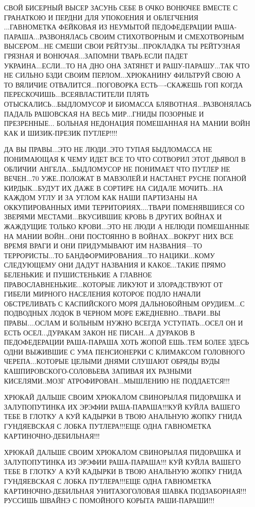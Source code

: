 СВОЙ БИСЕРНЫЙ ВЫСЕР ЗАСУНЬ СЕБЕ В ОЧКО ВОНЮЧЕЕ ВМЕСТЕ С ГРАНАТКОЮ И ПЕРДНИ ДЛЯ
УПОКОЕНИЯ И ОБЛЕГЧЕНИЯ ...ГАВНОМЕТКА ФЕЙКОВАЯ ИЗ НЕУМЫТОЙ ПЕДОФЕДЕРАЦИИ
РАША-ПАРАША...РАЗВОНЯЛАСЬ СВОИМ СТИХОТВОРНЫМ И СМЕХОТВОРНЫМ ВЫСЕРОМ...НЕ СМЕШИ
СВОИ РЕЙТУЗЫ...ПРОКЛАДКА ТЫ РЕЙТУЗНАЯ ГРЯЗНАЯ И ВОНЮЧАЯ...ЗАПОМНИ ТВАРЬ.ЕСЛИ
ПАДЕТ УКРАИНА...ЕСЛИ...ТО НА ДНО ОНА ЗАТЯНЕТ И РАШУ-ПАРАШУ...ТАК ЧТО НЕ СИЛЬНО
БЗДИ СВОИМ ПЕРЛОМ...ХРЮКАНИНУ ФИЛЬТРУЙ СВОЮ А ТО ВЯЛИЧИЕ ОТВАЛИТСЯ...ПОГОВОРКА
ЕСТЬ----СКАЖЕШЬ ГОП КОГДА ПЕРЕСКОЧИШЬ...ВСЕЯВЛАСТИТЕЛИ ПЛЯТЬ
ОТЫСКАЛИСЬ...БЫДЛОМУСОР И БИОМАССА БЛЯВОТНАЯ...РАЗВОНЯЛАСЬ ПАДАЛЬ РАШОВСКАЯ НА
ВЕСЬ МИР...ГНИДЫ ПОЗОРНЫЕ И ПРЕЗРЕННЫЕ... БОЛЬНАЯ НЕДОНАЦИЯ ПОМЕШАННАЯ НА МАНИИ
ВОЙН КАК И ШИЗИК-ПРЕЗИК ПУТЛЕР!!!!                              


ДА ВЫ ПРАВЫ...ЭТО НЕ ЛЮДИ..ЭТО ТУПАЯ БЫДЛОМАССА НЕ ПОНИМАЮЩАЯ К ЧЕМУ ИДЕТ ВСЕ
ТО ЧТО СОТВОРИЛ ЭТОТ ДЬЯВОЛ В ОБЛИЧИИ АНГЕЛА...БЫДЛОМУСОР НЕ ПОНИМАЕТ ЧТО
ПУТЛЕР НЕ ВЕЧЕН...70 УЖЕ..ПОЛОЖАТ В МАВЗОЛЕЙ.И НАСТАНЕТ РУСНЕ ПОГАНОЙ
КИРДЫК...БУДУТ ИХ ДАЖЕ В СОРТИРЕ НА СИДАЛЕ МОЧИТЬ...НА КАЖДОМ УГЛУ И ЗА УГЛОМ
КАК НАШИ ПАРТИЗАНЫ НА ОККУПИРОВАННЫХ ИМИ ТЕРРИТОРИЯХ....ТВАРИ ПОМЕНЯВШИЕСЯ СО
ЗВЕРЯМИ МЕСТАМИ...ВКУСИВШИЕ КРОВЬ В ДРУГИХ ВОЙНАХ И ЖАЖДУЩИЕ ТОЛЬКО КРОВИ...ЭТО
НЕ ЛЮДИ А НЕЛЮДИ ПОМЕШАННЫЕ НА МАНИИ ВОЙН...ОНИ ПОСТОЯННО В ВОЙНАХ...ВОКРУГ НИХ
ВСЕ ВРЕМЯ ВРАГИ И ОНИ ПРИДУМЫВАЮТ ИМ НАЗВАНИЯ---ТО ТЕРРОРИСТЫ...ТО
БАНДФОРМИРОВАНИЯ...ТО НАЦИКИ...КОМУ СЛЕДУЮЩЕМУ ОНИ ДАДУТ НАЗВАНИЯ И
КАКОЕ...ТАКИЕ ПРЯМО БЕЛЕНЬКИЕ И ПУШИСТЕНЬКИЕ А ГЛАВНОЕ
ПРАВОСЛАВНЕНЬКИЕ...КОТОРЫЕ ЛИКУЮТ И ЗЛОРАДСТВУЮТ ОТ ГИБЕЛИ МИРНОГО НАСЕЛЕНИЯ
КОТОРОЕ ПОДЛО НАЧАЛИ ОБСТРЕЛИВАТЬ С КАСПИЙСКОГО МОРЯ ДАЛЬНОБОЙНЫМ ОРУДИЕМ...С
ПОДВОДНЫХ ЛОДОК В ЧЕРНОМ МОРЕ ЕЖЕДНЕВНО...ТВАРИ..ВЫ ПРАВЫ....ОСЛАМ И БОЛЬНЫМ
НУЖНО ВСЕГДА УСТУПАТЬ...ОСЕЛ ОН И ЕСТЬ ОСЕЛ...ДУРАКАМ ЗАКОН НЕ ПИСАН...А
ДУРАКОВ В ПЕДОФЕДЕРАЦИИ РАША-ПАРАША ХОТЬ ЖОПОЙ ЕШЬ..ТЕМ БОЛЕЕ ЗДЕСЬ ОДНИ
ВЫЖИВШИЕ С УМА ПЕНСИОНЕРКИ С КЛИМАКСОМ ГОЛОВНОГО ЧЕРЕПА...КОТОРЫЕ ЦЕЛЫМИ ДНЯМИ
СЛУШАЮТ ОБРЯДЫ ВУДЫ КАШПИРОВСКОГО-СОЛОВЬЕВА ЗАПИВАЯ ИХ РАЗНЫМИ КИСЕЛЯМИ..МОЗГ
АТРОФИРОВАН...МЫШЛЕНИЮ НЕ ПОДДАЕТСЯ!!!

ХРЮКАЙ ДАЛЬШЕ СВОИМ ХРЮКАЛОМ СВИНОРЫЛАЯ ПИДОРАШКА И ЗАЛУПОПУТИНКА ИХ ЭРЭФИИ
РАША-ПАРАША!!!КУЙ КУЙЛА ВАШЕГО ТЕБЕ В ГЛОТКУ А КУЙ КАДЫРКИ В ТВОЮ АНАЛЬНУЮ
ЖОПКУ ГНИДА ГУНДЯЕВСКАЯ С ЛОБКА ПУТЛЕРА!!!ЕЩЕ ОДНА ГАВНОМЕТКА
КАРТИНОЧНО-ДЕБИЛЬНАЯ!!!                     

ХРЮКАЙ ДАЛЬШЕ СВОИМ ХРЮКАЛОМ СВИНОРЫЛАЯ ПИДОРАШКА И ЗАЛУПОПУТИНКА ИЗ ЭРЭФИИ
РАША-ПАРАША!!!  КУЙ КУЙЛА ВАШЕГО ТЕБЕ В ГЛОТКУ А КУЙ КАДЫРКИ В ТВОЮ АНАЛЬНУЮ
ЖОПКУ ГНИДА ГУНДЯЕВСКАЯ С ЛОБКА ПУТЛЕРА!!!ЕЩЕ ОДНА ГАВНОМЕТКА
КАРТИНОЧНО-ДЕБИЛЬНАЯ УНИТАЗОГОЛОВАЯ ШАВКА ПОДЗАБОРНАЯ!!! РУССИШЬ ШВАЙНЭ С
ПОМОЙНОГО КОРЫТА РАШИ-ПАРАШИ!!!        

